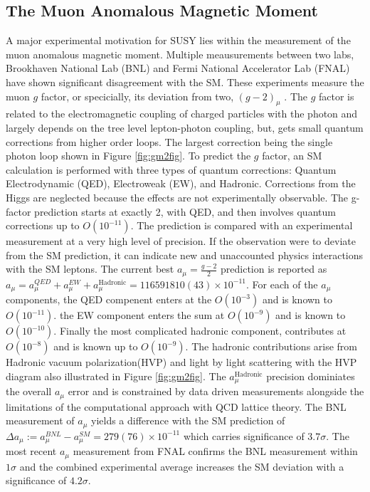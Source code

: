 \subsection{The Muon Anomalous Magnetic Moment}

A major experimental motivation for SUSY lies within the measurement of the muon anomalous magnetic moment.  Multiple meausurements between two labs, Brookhaven National Lab (BNL) and Fermi National Accelerator Lab (FNAL) have shown significant disagreement with the SM. These experiments measure the muon $g$ factor, or specicially, its deviation from two, $(g-2)_\mu$ .  The $g$ factor is related to the electromagnetic coupling of charged particles with the photon and largely depends on the tree level lepton-photon coupling, but, gets small quantum corrections from higher order loops. The largest correction being the single photon loop shown in Figure \ref{fig:gm2fig}. To predict the $g$ factor, an SM calculation is performed with three types of quantum corrections: Quantum Electrodynamic (QED), Electroweak (EW), and Hadronic. Corrections from the Higgs are neglected because the effects are not experimentally observable. %
The g-factor prediction starts at exactly 2, with QED, and then involves quantum corrections up to $O(10^{-11})$. The prediction is compared with an experimental measurement at a very high level of precision. If the observation were to deviate from the SM prediction, it can indicate new and unaccounted physics interactions with the SM leptons.
The current best $a_\mu = \frac{g-2}{2}$ prediction is reported as $a_\mu= a_\mu^{QED}+ a_\mu^{EW}+a_\mu^{\text{Hadronic}} =  116 591 810(43) \times 10^{-11}$.
 For each of the $a_\mu$ components, the QED compenent enters at the $O(10^{-3})$ and is known to $O(10^{-11})$. the EW component enters the sum at $O(10^{-9})$ and is known to $O(10^{-10})$. Finally the most complicated hadronic component, contributes at $O(10^{-8})$ and is known up to $O(10^{-9})$. The hadronic contributions arise from Hadronic vacuum polarization(HVP) and light by light scattering with the  HVP diagram also illustrated in Figure \ref{fig:gm2fig}. The $a_\mu^{\text{Hadronic}}$ precision dominiates the overall $a_\mu$ error and is constrained by data driven measurements alongside the limitations of the computational approach with QCD lattice theory. The BNL measurement of $a_\mu$ yields a difference with the SM prediction of $\Delta a_\mu := a_\mu^{BNL} - a_\mu^{SM} = 279(76) \times 10^{-11}$ which carries significance of $3.7\sigma$. The most recent $a_\mu$ measurement from FNAL confirms the BNL measurement within $1\sigma$ and the combined experimental average increases the SM deviation with a significance of $4.2\sigma$.


